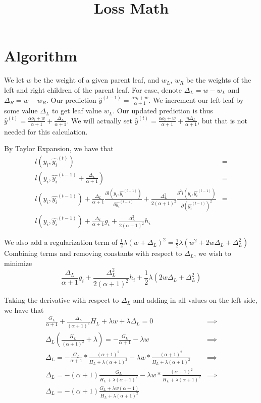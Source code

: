 \documentclass{article}
\begin{document}
\title{Loss Math}
\author{}
\date{}

\maketitle

\section*{Algorithm}
We let $w$ be the weight of a given parent leaf, and $w_L$, $w_R$ be the weights of the left and right children of the parent leaf. 
For ease, denote $\Delta_L = w - w_L$ and $\Delta_R = w - w_R$. Our prediction $\hat{y}^{(t - 1)} = \frac{\alpha o_i + w}{\alpha + 1}$. 
We increment our left leaf by some value $\Delta_L$ to get leaf value $w_L$. Our updated prediction is thus
$\hat{y}^{(t)} = \frac{\alpha o_i + w}{\alpha + 1} + \frac{\Delta_L}{\alpha + 1}$. We will actually set $\hat{y}^{(t)} = \frac{\alpha o_i + w}{\alpha + 1} + \frac{\eta \Delta_L}{\alpha + 1}$, 
but that is not needed for this calculation.

By Taylor Expansion, we have that \begin{align*}
    l(y_i, \hat{y_i}^{(t)}) &= \\
    l(y_i, \hat{y_i}^{(t - 1)} + \frac{\Delta_L}{\alpha + 1}) &= \\
    l(y_i, \hat{y_i}^{(t - 1)}) + \frac{\Delta_L}{\alpha + 1} \frac{\partial l(y_i, \hat{y_i}^{(t - 1)})}{\partial \hat{y_i}^{(t - 1)}} + \frac{\Delta_L^2}{2 (\alpha + 1)^2} \frac{\partial^2 l(y_i, \hat{y_i}^{(t - 1)})}{\partial (\hat{y_i}^{(t - 1)})^2}&= \\
    l(y_i, \hat{y_i}^{(t - 1)}) + \frac{\Delta_L}{\alpha + 1} g_i + \frac{\Delta_L^2}{2 (\alpha + 1)^2} h_i
\end{align*}

We also add a regularization term of $\frac{1}{2}\lambda(w + \Delta_L)^2 = \frac{1}{2} \lambda (w^2 + 2w\Delta_L + \Delta_L^2)$
Combining terms and removing constants with respect to $\Delta_L$, we wish to minimize \[
 \frac{\Delta_L}{\alpha + 1} g_i + \frac{\Delta_L^2}{2(\alpha + 1)^2} h_i + \frac{1}{2} \lambda (2w\Delta_L + \Delta_L^2)
\]

Taking the derivative with respect to $\Delta_L$ and adding in all values on the left side, we have that \begin{align*}
    \frac{G_L}{\alpha + 1} + \frac{\Delta_L}{(\alpha + 1)^2} H_L + \lambda w + \lambda \Delta_L = 0 &\implies \\
    \Delta_L \left(\frac{H_L}{(\alpha + 1)^2} + \lambda \right) = -\frac{G_L}{\alpha + 1} - \lambda w &\implies \\
    \Delta_L = - \frac{G_L}{\alpha + 1} * \frac{(\alpha + 1)^2}{H_L + \lambda(\alpha + 1)^2} - \lambda w *  \frac{(\alpha + 1)^2}{H_L + \lambda(\alpha + 1)^2} &\implies \\ 
    \Delta_L = - (\alpha + 1) \frac{G_L}{H_L + \lambda (\alpha + 1)^2} - \lambda w *  \frac{(\alpha + 1)^2}{H_L + \lambda(\alpha + 1)^2} &\implies \\
    \Delta_L = - (\alpha + 1) \frac{G_L + \lambda w (\alpha + 1)}{H_L + \lambda (\alpha + 1)^2}
\end{align*}
\end{document}
